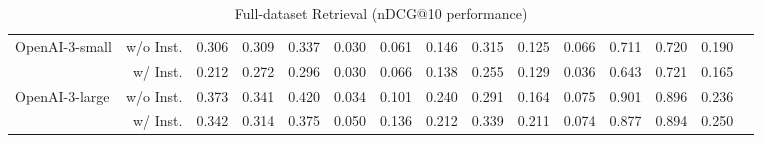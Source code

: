 \begin{table}[!htp]
{\begin{tabular}{lr|rcccccccccc|cc}
\multirow{2}{*}{OpenAI-3-small} & w/o Inst. & 0.306 & 0.309 & 0.337 & 0.030 & 0.061 & 0.146 & 0.315 & 0.125 & 0.066 & 0.711 & 0.720 &0.190\\
 & w/ Inst. & 0.212 & 0.272 & 0.296 & 0.030 & 0.066 & 0.138 & 0.255 & 0.129 & 0.036 & 0.643 &0.721 &0.165\\

\multirow{2}{*}{OpenAI-3-large} & w/o Inst. & 0.373 & 0.341 & 0.420 & 0.034 & 0.101 & 0.240 & 0.291 & 0.164 & 0.075 & 0.901 & 0.896 &0.236\\
 & w/ Inst. & 0.342 & 0.314 & 0.375 & 0.050 & 0.136 & 0.212 & 0.339 & 0.211 & 0.074 & 0.877 & 0.894 &0.250\\
 
\bottomrule
\end{tabular}}
\caption{Full-dataset Retrieval (nDCG@10 performance)}\label{tab: full-dataset ndcg@10}
\end{table}